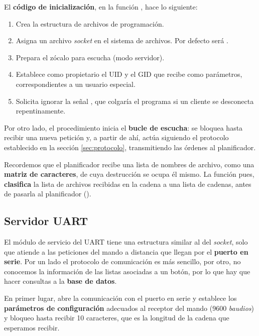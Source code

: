El \textbf{código de inicialización}, en la función , hace lo siguiente:

\begin{enumerate}
	\item Crea la estructura de archivos de programación.
	\item Asigna un archivo \textit{socket} en el sistema de archivos. Por defecto será .
	\item Prepara el zócalo para escucha (modo servidor).
	\item Establece como propietario el \acrshort{UID} y el \acrshort{GID} que recibe como parámetros, correspondientes a un usuario especial.
	\item Solicita ignorar la señal , que colgaría el programa si un cliente se desconecta repentinamente.
\end{enumerate}

Por otro lado, el procedimiento  inicia el \textbf{bucle de escucha}: se bloquea hasta recibir una nueva petición y, a partir de ahí, actúa siguiendo el protocolo establecido en la sección \ref{sec:protocolo}, transmitiendo las órdenes al planificador.

Recordemos que el planificador recibe una lista de nombres de archivo, como una \textbf{matriz de caracteres}, de cuya destrucción se ocupa él mismo. La función  pues, \textbf{clasifica} la lista de archivos recibidas en la cadena a una lista de cadenas, antes de pasarla al planificador ().

\subsection{Servidor UART}

El módulo de servicio del \acrshort{UART} tiene una estructura similar al del \textit{socket}, solo que atiende a las peticiones del mando a distancia que llegan por el \textbf{puerto en serie}. Por un lado el protocolo de comunicación es más sencillo, por otro, no conocemos la información de las listas asociadas a un botón, por lo que hay que hacer consultas a la \textbf{base de datos}.

En primer lugar,  abre la comunicación con el puerto en serie y establece los \textbf{parámetros de configuración} adecuados al receptor del mando (9600 \textit{baudios}) y bloqueo hasta recibir 10 caracteres, que es la longitud de la cadena que esperamos recibir.

